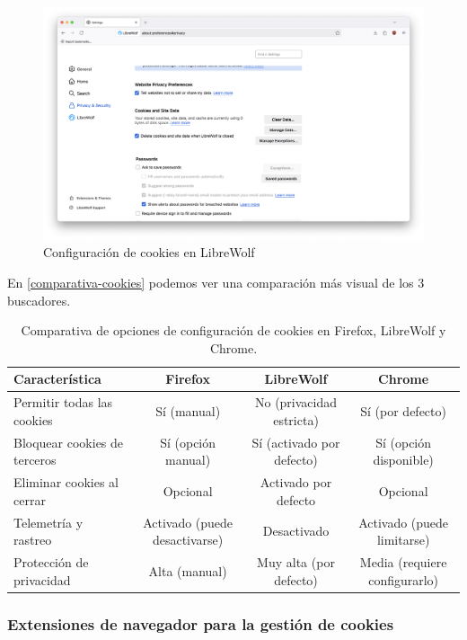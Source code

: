 \begin{figure}[H]   
    \includegraphics[width=15cm]{cookies_librewolf_ej14a.png}
    \caption{Configuración de cookies en LibreWolf}
    \label{fig:cookies_librewolf}
\end{figure}

En \ref{comparativa-cookies} podemos ver una comparación más visual de los 3 buscadores.

\begin{table}[H]
    \centering
    \begin{tabular}{|l|c|c|c|}
    \hline
    \textbf{Característica} & \textbf{Firefox} & \textbf{LibreWolf} & \textbf{Chrome} \\ \hline
    Permitir todas las cookies & Sí (manual) & No (privacidad estricta) & Sí (por defecto) \\ \hline
    Bloquear cookies de terceros & Sí (opción manual) & Sí (activado por defecto) & Sí (opción disponible) \\ \hline
    Eliminar cookies al cerrar & Opcional & Activado por defecto & Opcional \\ \hline
    Telemetría y rastreo & Activado (puede desactivarse) & Desactivado & Activado (puede limitarse) \\ \hline
    Protección de privacidad & Alta (manual) & Muy alta (por defecto) & Media (requiere configurarlo) \\ \hline
    \end{tabular}
    \caption{Comparativa de opciones de configuración de cookies en Firefox, LibreWolf y Chrome.}
    \label{tab:comparativa-cookies}
\end{table}

\subsubsection{Extensiones de navegador para la gestión de cookies}

